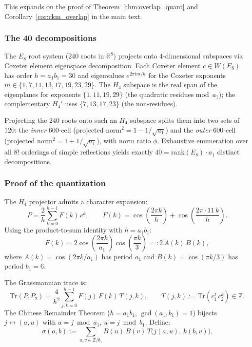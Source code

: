 \documentclass[12pt,a4paper]{article}
\theoremstyle{definition}
\begin{document}
This expands on the proof of Theorem~\ref{thm:overlap_quant} and Corollary~\ref{cor:ckm_overlap} in the main text.

\subsubsection{The 40 decompositions}
The $E_8$ root system ($240$ roots in $\mathbb{R}^8$) projects onto $4$-dimensional subspaces via Coxeter element eigenspace decomposition.  Each Coxeter element $c \in W(E_8)$ has order $h = a_1 b_1 = 30$ and eigenvalues $e^{2\pi i m/h}$ for the Coxeter exponents $m \in \{1, 7, 11, 13, 17, 19, 23, 29\}$.  The $H_4$ subspace is the real span of the eigenplanes for exponents $\{1, 11, 19, 29\}$ (the quadratic residues mod~$a_1$); the complementary $H_4'$ uses $\{7, 13, 17, 23\}$ (the non-residues).

Projecting the $240$ roots onto such an $H_4$ subspace splits them into two sets of $120$: the \emph{inner} 600-cell (projected norm${}^2 = 1 - 1/\sqrt{a_1}$) and the \emph{outer} 600-cell (projected norm${}^2 = 1 + 1/\sqrt{a_1}$), with norm ratio $\phi$.  Exhaustive enumeration over all $8!$ orderings of simple reflections yields exactly $40 = \mathrm{rank}(E_8) \cdot a_1$ distinct decompositions.

\subsubsection{Proof of the quantization}
\label{sec:S-overlap-proof}

The $H_4$ projector admits a character expansion:
\begin{equation}
P = \frac{2}{h}\sum_{k=0}^{h-1} F(k)\, c^k, \qquad F(k) = \cos\!\left(\frac{2\pi k}{h}\right) + \cos\!\left(\frac{2\pi \cdot 11\, k}{h}\right).
\end{equation}
Using the product-to-sum identity with $h = a_1 b_1$:
\begin{equation}
F(k) = 2\cos\!\left(\frac{2\pi k}{a_1}\right)\cos\!\left(\frac{\pi k}{3}\right) =: 2\, A(k)\, B(k),
\end{equation}
where $A(k) = \cos(2\pi k/a_1)$ has period $a_1$ and $B(k) = \cos(\pi k/3)$ has period $b_1 = 6$.

The Grassmannian trace is:
\begin{equation}
\mathrm{Tr}(P_1 P_2) = \frac{4}{h^2} \sum_{j,k=0}^{h-1} F(j)\,F(k)\,T(j,k), \qquad T(j,k) := \mathrm{Tr}(c_1^j\, c_2^k) \in \mathbb{Z}.
\end{equation}
The Chinese Remainder Theorem ($h = a_1 b_1$, $\gcd(a_1, b_1) = 1$) bijects $j \leftrightarrow (a, u)$ with $a = j \bmod a_1$, $u = j \bmod b_1$.  Define:
\begin{equation}
\sigma(a,b) := \sum_{u,v \in \mathbb{Z}/b_1} B(u)\,B(v)\,T\bigl(j(a,u),\, k(b,v)\bigr).
\end{equation}
\end{document}
